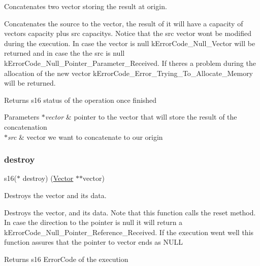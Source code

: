 Concatenates two vector storing the result at origin. 

Concatenates the source to the vector, the result of it will have a capacity of vector\textquotesingle{}s capacity plus src capacity\textquotesingle{}s. Notice that the src vector won\textquotesingle{}t be modified during the execution. In case the vector is null k\+Error\+Code\+\_\+\+Null\+\_\+\+Vector will be returned and in case the the src is null k\+Error\+Code\+\_\+\+Null\+\_\+\+Pointer\+\_\+\+Parameter\+\_\+\+Received. If there\textquotesingle{}s a problem during the allocation of the new vector k\+Error\+Code\+\_\+\+Error\+\_\+\+Trying\+\_\+\+To\+\_\+\+Allocate\+\_\+\+Memory will be returned.

\begin{DoxyReturn}{Returns}
s16 status of the operation once finished 
\end{DoxyReturn}

\begin{DoxyParams}{Parameters}
{\em $\ast$vector} & pointer to the vector that will store the result of the concatenation \\
\hline
{\em $\ast$src} & vector we want to concatenate to our origin \\
\hline
\end{DoxyParams}
\mbox{\label{structadt__vector__ops__s_ad7824912241e23089f2230471ecd4f36}} 
\subsubsection{\texorpdfstring{destroy}{destroy}}
{\footnotesize\ttfamily s16($\ast$ destroy) (\hyperlink{structadt__vector__s}{Vector} $\ast$$\ast$vector)}



Destroys the vector and it\textquotesingle{}s data. 

Destroys the vector, and its data. Note that this function calls the reset method. In case the direction to the pointer is null it will return a k\+Error\+Code\+\_\+\+Null\+\_\+\+Pointer\+\_\+\+Reference\+\_\+\+Received. If the execution went well this function assures that the pointer to vector ends as N\+U\+LL

\begin{DoxyReturn}{Returns}
s16 Error\+Code of the execution 
\end{DoxyReturn}

